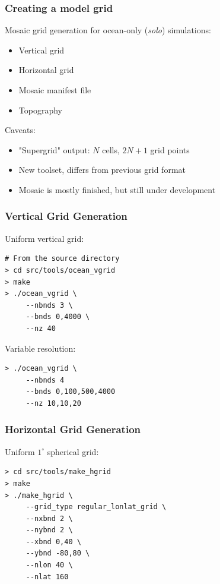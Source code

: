 \documentclass[red]{beamer}
\begin{document}
\begin{frame}
    \frametitle{Creating a model grid}
    
    Mosaic grid generation for ocean-only (\textit{solo}) simulations:
    \begin{itemize}
        \item Vertical grid
        \item Horizontal grid
        \item Mosaic manifest file
        \item Topography
    \end{itemize}
    
    Caveats:
    \begin{itemize}
        \item "Supergrid" output: $N$ cells, $2N+1$ grid points
        \item New toolset, differs from previous grid format
        \item Mosaic is mostly finished, but still under development
    \end{itemize}
\end{frame}

\begin{frame}[fragile]
    \frametitle{Vertical Grid Generation}
    
    Uniform vertical grid:
    \begin{lstlisting}
# From the source directory
> cd src/tools/ocean_vgrid
> make
> ./ocean_vgrid \
     --nbnds 3 \
     --bnds 0,4000 \
     --nz 40
    \end{lstlisting}
    
    Variable resolution:
    \begin{lstlisting}
> ./ocean_vgrid \
     --nbnds 4
     --bnds 0,100,500,4000
     --nz 10,10,20
    \end{lstlisting}
\end{frame}
\begin{frame}[fragile]
    \frametitle{Horizontal Grid Generation}
   
    Uniform $1^\circ$ spherical grid:
    \begin{lstlisting}
> cd src/tools/make_hgrid
> make
> ./make_hgrid \
     --grid_type regular_lonlat_grid \
     --nxbnd 2 \
     --nybnd 2 \
     --xbnd 0,40 \
     --ybnd -80,80 \
     --nlon 40 \
     --nlat 160
    \end{lstlisting}
\end{frame}
\end{document}
